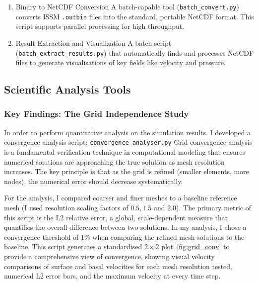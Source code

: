 \begin{enumerate}
\item{Binary to NetCDF Conversion} A batch-capable tool (\texttt{batch\_convert.py}) converts ISSM \texttt{.outbin} files into the standard, portable NetCDF format. This script supports parallel processing for high throughput.
\item{Result Extraction and Visualization} A batch script (\texttt{batch\_extract\_results.py}) that automatically finds and processes NetCDF files to generate visualisations of key fields like velocity and pressure. 
\end{enumerate}

\subsection{Scientific Analysis Tools}

\subsubsection{Key Findings: The Grid Independence Study}\label{grid_ind}
In order to  perform quantitative analysis on the simulation results. 
I developed a convergence analysis script: \texttt{convergence\_analyser.py}
Grid convergence analysis is a fundamental verification technique in computational modeling that ensures numerical solutions are approaching the true solution as mesh resolution increases. The key principle is that as the grid is refined (smaller elements, more nodes), the numerical error should decrease systematically.

For the analysis, I compared coarser and finer meshes to a baseline reference mesh (I used resolution scaling factors of $0.5, 1.5$ and $2.0$). The primary metric of this script is the L2 relative error, a global, scale-dependent measure that quantifies the overall difference between two solutions. In my analysis, I chose a convergence threshold of $1\%$ when comparing the refined mesh solutions to the baseline.
This script generates a standardised $2\times2$ plot~\ref{fig:grid_conv} to provide a comprehensive view of convergence, showing visual velocity comparisons of surface and basal velocities for each mesh resolution tested, numerical L2 error bars, and the maximum velocity at every time step.

